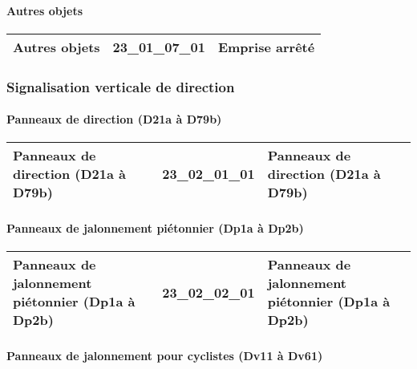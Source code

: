 \documentclass[12pt,titlepage,oneside]{book}
\begin{document}
\paragraph{Autres objets}
\noindent
\vspace{\baselineskip}

\renewcommand{\arraystretch}{1.2}
\begin{supertabular}{|p{10cm}|c|p{15cm}|}
 Autres objets & 23\_01\_07\_01 & Emprise arrêté\\
\hline
\end{supertabular}

\subsubsection{\large Signalisation verticale de direction}
\paragraph{Panneaux de direction (D21a à D79b)}
\noindent
\vspace{\baselineskip}

\renewcommand{\arraystretch}{1.2}
\begin{supertabular}{|p{10cm}|c|p{15cm}|}
 Panneaux de direction (D21a à D79b) & 23\_02\_01\_01 & Panneaux de direction (D21a à D79b)\\
\hline
\end{supertabular}


\paragraph{Panneaux de jalonnement piétonnier (Dp1a à Dp2b)}
\noindent
\vspace{\baselineskip}

\renewcommand{\arraystretch}{1.2}
\begin{supertabular}{|p{10cm}|c|p{15cm}|}
 Panneaux de jalonnement piétonnier (Dp1a à Dp2b) & 23\_02\_02\_01 & Panneaux de jalonnement piétonnier (Dp1a à Dp2b)\\
\hline
\end{supertabular}


\paragraph{Panneaux de jalonnement pour cyclistes (Dv11 à Dv61)}
\noindent
\vspace{\baselineskip}
\end{document}
